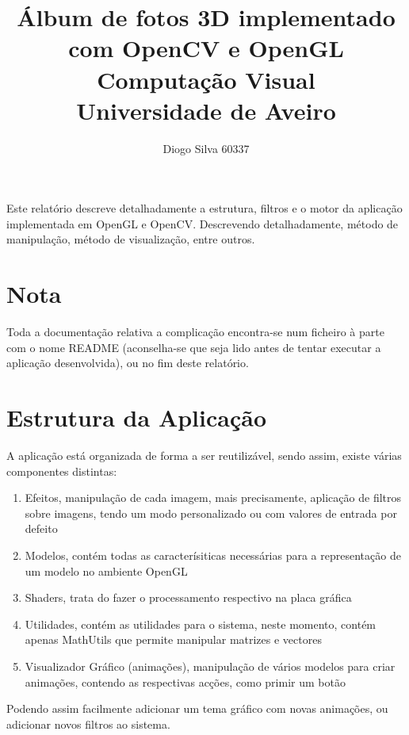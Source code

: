 \documentclass[portugues,final]{revdetua}
\begin{document}

\title{\textbf{Álbum de fotos 3D implementado com OpenCV e OpenGL} \\ Computação Visual\\Universidade de Aveiro}
\author{Diogo Silva 60337}
\maketitle
\begin{resumo} %
Este relatório descreve detalhadamente a estrutura, filtros e o motor da aplicação implementada em OpenGL e OpenCV.
Descrevendo detalhadamente, método de manipulação, método de visualização, entre outros.
\end{resumo}

\section*{Nota}
Toda a documentação relativa a complicação encontra-se num ficheiro à parte com o nome README (aconselha-se que seja lido antes de tentar executar a aplicação desenvolvida), ou no fim deste relatório.
\section{Estrutura da Aplicação}

A aplicação está organizada de forma a ser reutilizável, sendo assim, existe várias componentes distintas:
\begin{enumerate}
\item Efeitos, manipulação de cada imagem, mais precisamente, aplicação de filtros sobre imagens, tendo um modo personalizado ou com valores de entrada por defeito
\item Modelos, contém todas as caracterísiticas necessárias para a representação de um modelo no ambiente OpenGL
\item Shaders, trata do fazer o processamento respectivo na placa gráfica
\item Utilidades, contém as utilidades para o sistema, neste momento, contém apenas MathUtils que permite manipular matrizes e vectores
\item Visualizador Gráfico (animações), manipulação de vários modelos para criar animações, contendo as respectivas acções, como primir um botão
\end{enumerate}

Podendo assim facilmente adicionar um tema gráfico com novas animações, ou adicionar novos filtros ao sistema.
\end{document}
